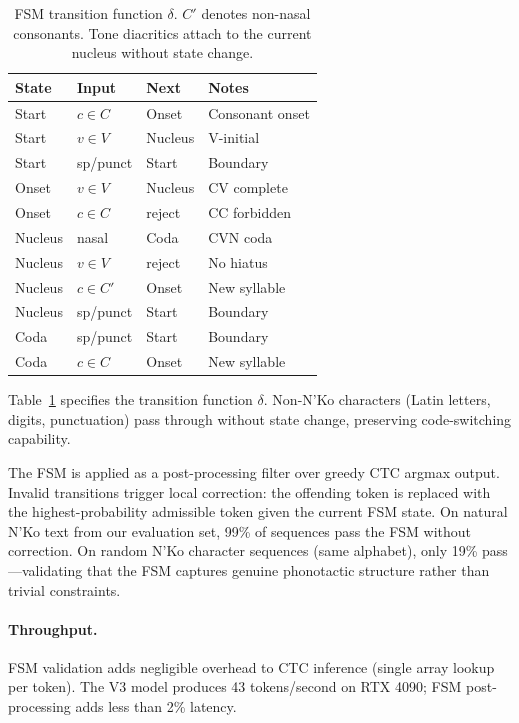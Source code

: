 \documentclass[11pt]{article}
\begin{document}
\begin{table}[t]
\centering
\small
\begin{tabular}{llll}
\toprule
\textbf{State} & \textbf{Input} & \textbf{Next} & \textbf{Notes} \\
\midrule
Start & $c \in C$ & Onset & Consonant onset \\
Start & $v \in V$ & Nucleus & V-initial \\
Start & sp/punct & Start & Boundary \\
Onset & $v \in V$ & Nucleus & CV complete \\
Onset & $c \in C$ & reject & CC forbidden \\
Nucleus & nasal & Coda & CVN coda \\
Nucleus & $v \in V$ & reject & No hiatus \\
Nucleus & $c \in C'$ & Onset & New syllable \\
Nucleus & sp/punct & Start & Boundary \\
Coda & sp/punct & Start & Boundary \\
Coda & $c \in C$ & Onset & New syllable \\
\bottomrule
\end{tabular}
\caption{FSM transition function $\delta$. $C'$ denotes non-nasal consonants. Tone diacritics attach to the current nucleus without state change.}
\label{tab:fsm-transitions}
\end{table}

Table~\ref{tab:fsm-transitions} specifies the transition function $\delta$.
Non-N'Ko characters (Latin letters, digits, punctuation) pass through without state change, preserving code-switching capability.

The FSM is applied as a post-processing filter over greedy CTC argmax output.
Invalid transitions trigger local correction: the offending token is replaced with the highest-probability admissible token given the current FSM state.
On natural N'Ko text from our evaluation set, 99\% of sequences pass the FSM without correction.
On random N'Ko character sequences (same alphabet), only 19\% pass---validating that the FSM captures genuine phonotactic structure rather than trivial constraints.

\paragraph{Throughput.}
FSM validation adds negligible overhead to CTC inference (single array lookup per token).
The V3 model produces 43 tokens/second on RTX 4090; FSM post-processing adds less than 2\% latency.
\end{document}
